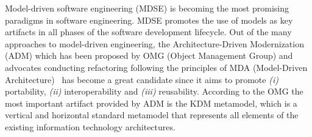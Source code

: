 Model-driven software engineering (MDSE) is becoming the most promising paradigms in software engineering. MDSE promotes the use of models as key artifacts in all phases of the software development lifecycle. Out of the many approaches to model-driven engineering, the Architecture-Driven Modernization (ADM) which has been proposed by OMG (Object Management Group) and advocates conducting refactoring following the principles of MDA (Model-Driven Architecture)~\cite{Ulrich:2010:IST:1841736} has become a great candidate since it aims to promote \textit{(i)} portability, \textit{(ii)} interoperability and \textit{(iii)} reusability. According to the OMG the most important artifact provided by ADM is the KDM metamodel, which is a vertical and horizontal standard metamodel that represents all elements of the existing information  technology architectures. %


